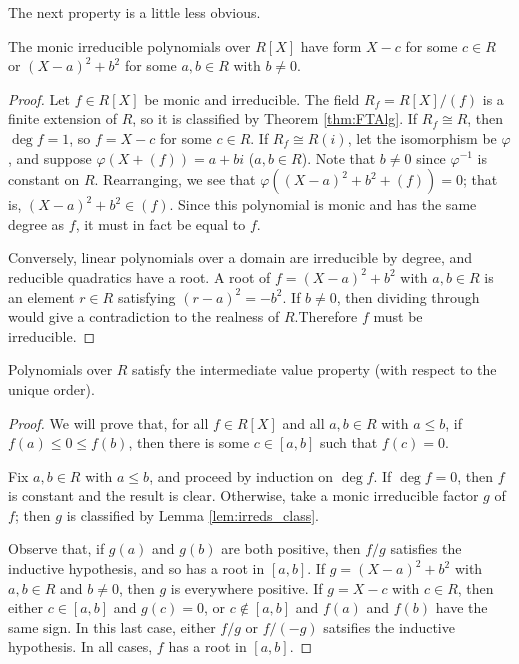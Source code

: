 The next property is a little less obvious.

\begin{lemma}
  \label{lem:irreds_class}
  The monic irreducible polynomials over $R[X]$ have form $X-c$ for some $c\in R$ or $(X-a)^2+b^2$ for some $a,b\in R$ with $b\neq0$.
\end{lemma}
\begin{proof}
  Let $f\in R[X]$ be monic and irreducible. The field $R_f=R[X]/(f)$ is a finite extension of $R$, so it is classified by Theorem \ref{thm:FTAlg}. If $R_f\cong R$, then $\deg f=1$, so $f=X-c$ for some $c\in R$. If $R_f\cong R(i)$, let the isomorphism be $\varphi$, and suppose $\varphi(X+(f))=a+bi$ ($a,b\in R$). Note that $b\neq0$ since $\varphi^{-1}$ is constant on $R$. Rearranging, we see that $\varphi((X-a)^2+b^2+(f))=0$; that is, $(X-a)^2+b^2\in(f)$. Since this polynomial is monic and has the same degree as $f$, it must in fact be equal to $f$.

  Conversely, linear polynomials over a domain are irreducible by degree, and reducible quadratics have a root. A root of $f=(X-a)^2+b^2$ with $a,b\in R$ is an element $r\in R$ satisfying $(r-a)^2=-b^2$. If $b\neq0$, then dividing through would give a contradiction to the realness of $R$.Therefore $f$ must be irreducible.
\end{proof}

\begin{lemma}
  \label{lem:IVP_poly}
  Polynomials over $R$ satisfy the intermediate value property (with respect to the unique order).
\end{lemma}
\begin{proof}
  We will prove that, for all $f\in R[X]$ and all $a,b\in R$ with $a\leq b$, if $f(a)\leq 0\leq f(b)$, then there is some $c\in[a,b]$ such that $f(c)=0$.

  Fix $a,b\in R$ with $a\leq b$, and proceed by induction on $\deg f$. If $\deg f=0$, then $f$ is constant and the result is clear. Otherwise, take a monic irreducible factor $g$ of $f$; then $g$ is classified by Lemma \ref{lem:irreds_class}.

  Observe that, if $g(a)$ and $g(b)$ are both positive, then $f/g$ satisfies the inductive hypothesis, and so has a root in $[a,b]$. If $g=(X-a)^2+b^2$ with $a,b\in R$ and $b\neq0$, then $g$ is everywhere positive. If $g=X-c$ with $c\in R$, then either $c\in[a,b]$ and $g(c)=0$, or $c\notin[a,b]$ and $f(a)$ and $f(b)$ have the same sign. In this last case, either $f/g$ or $f/(-g)$ satsifies the inductive hypothesis. In all cases, $f$ has a root in $[a,b]$.
\end{proof}


